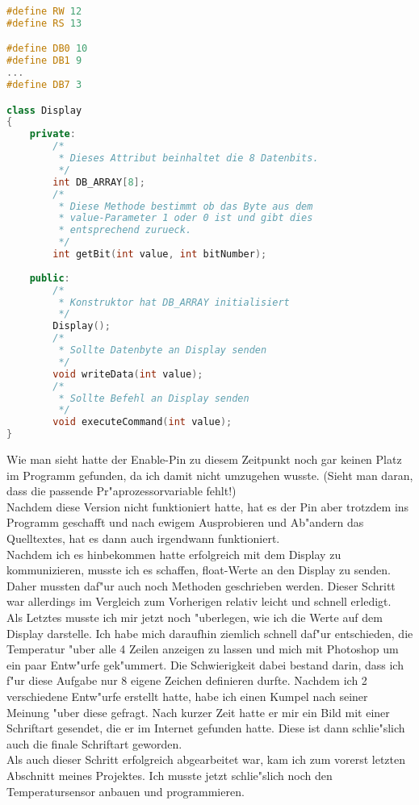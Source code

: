 \documentclass[a4paper]{scrreprt}
\begin{document}
			\begin{lstlisting}[language=c++]
#define RW 12
#define RS 13

#define DB0 10
#define DB1 9
...
#define DB7 3

class Display
{
	private:
		/*
		 * Dieses Attribut beinhaltet die 8 Datenbits.
		 */
		int DB_ARRAY[8];
		/*
		 * Diese Methode bestimmt ob das Byte aus dem  
		 * value-Parameter 1 oder 0 ist und gibt dies 
		 * entsprechend zurueck.
		 */
		int getBit(int value, int bitNumber);
		
	public:
		/*
		 * Konstruktor hat DB_ARRAY initialisiert
		 */
		Display();
		/*
		 * Sollte Datenbyte an Display senden
		 */
		void writeData(int value);
		/*
		 * Sollte Befehl an Display senden
		 */
		void executeCommand(int value);
}
			\end{lstlisting} 
			Wie man sieht hatte der Enable-Pin zu diesem Zeitpunkt noch	gar keinen 
			Platz im Programm gefunden, da ich damit nicht umzugehen wusste.
			(Sieht man daran, dass die passende Pr"aprozessorvariable fehlt!) \\
			Nachdem diese Version nicht funktioniert hatte, hat es der Pin
			aber trotzdem ins Programm geschafft und nach ewigem Ausprobieren und 
			Ab"andern das Quelltextes, hat es dann auch irgendwann funktioniert. \\
			\newline
			Nachdem ich es hinbekommen hatte erfolgreich mit dem Display zu kommunizieren,
			musste ich es schaffen, float-Werte an den Display zu senden. Daher 
			mussten daf"ur auch noch Methoden geschrieben werden.
			Dieser Schritt war allerdings im Vergleich zum Vorherigen relativ leicht 
			und schnell erledigt. \\
			Als Letztes musste ich mir jetzt noch "uberlegen, wie ich die Werte
			auf dem Display darstelle. Ich habe mich daraufhin ziemlich schnell daf"ur 
			entschieden, die Temperatur "uber alle 4 Zeilen anzeigen zu lassen und mich
			mit Photoshop um ein paar Entw"urfe gek"ummert. Die Schwierigkeit dabei bestand
			darin, dass ich f"ur diese Aufgabe nur 8 eigene Zeichen definieren durfte.
			Nachdem ich 2 verschiedene Entw"urfe erstellt hatte, habe ich einen Kumpel nach
			seiner Meinung "uber diese gefragt. Nach kurzer Zeit hatte er mir ein Bild mit
			einer Schriftart gesendet, die er im Internet gefunden hatte. Diese ist dann 
			schlie"slich auch die finale Schriftart geworden. \\
			Als auch dieser Schritt erfolgreich abgearbeitet war, kam ich zum vorerst letzten
			Abschnitt meines Projektes. Ich musste jetzt schlie"slich noch den 
			Temperatursensor anbauen und programmieren.  
\end{document}
